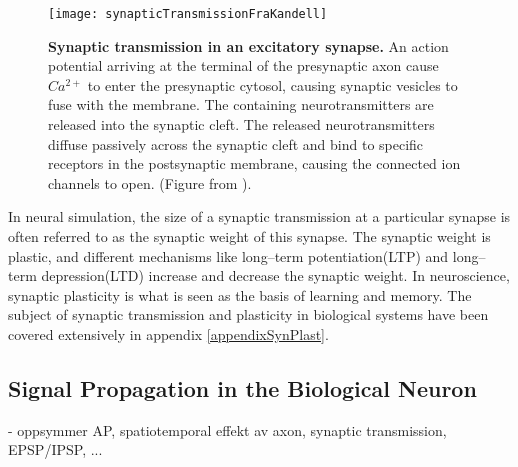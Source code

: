 \begin{figure}[hbt!p]
    \centering
    \texttt{[image: synapticTransmissionFraKandell]}	%
 	  \caption{\textbf{Synaptic transmission in an excitatory synapse.} 
			An action potential arriving at the terminal of the presynaptic axon cause $Ca^{2+}$ to enter the presynaptic cytosol, causing synaptic vesicles to fuse with the membrane.
			The containing neurotransmitters are released into the synaptic cleft.
			The released neurotransmitters diffuse passively across the synaptic cleft and bind to specific receptors in the postsynaptic membrane, causing the connected ion channels to open.
			(Figure from \cite{PrinciplesOfNeuralScience4edKAP10}).
			}
    \label{figActionPotential}
\end{figure}

		In neural simulation, the size of a synaptic transmission at a particular synapse is often referred to as the synaptic weight of this synapse.
		The synaptic weight is plastic, and different mechanisms like long--term potentiation(LTP) and long--term depression(LTD) increase and decrease the synaptic weight.
		In neuroscience, synaptic plasticity is what is seen as the basis of learning and memory\cite{NeuroscienceExploringTheBrain3edKAP25}. %
		The subject of synaptic transmission and plasticity in biological systems have been covered extensively in appendix \ref{appendixSynPlast}.

	\subsection{Signal Propagation in the Biological Neuron}
		

		- oppsymmer AP, spatiotemporal effekt av axon, synaptic transmission, EPSP/IPSP, ...

